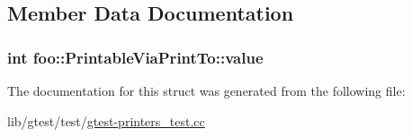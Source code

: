 \subsection{Member Data Documentation}
\hypertarget{structfoo_1_1_printable_via_print_to_a16f8c6420275d86f0d0112ca5a41bca2}{
\subsubsection[{value}]{\setlength{\rightskip}{0pt plus 5cm}int foo\-::\-Printable\-Via\-Print\-To\-::value}}\label{structfoo_1_1_printable_via_print_to_a16f8c6420275d86f0d0112ca5a41bca2}


The documentation for this struct was generated from the following file\-:\begin{DoxyCompactItemize}
\item 
lib/gtest/test/\hyperlink{gtest-printers__test_8cc}{gtest-\/printers\-\_\-test.\-cc}\end{DoxyCompactItemize}
